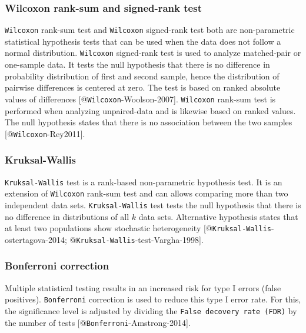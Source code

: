 \documentclass[
  parskip,
  oneside]{scrreprt}
\begin{document}
\hypertarget{wilcoxon-rank-sum-and-signed-rank-test}{%
\subsubsection{Wilcoxon rank-sum and signed-rank
test}\label{wilcoxon-rank-sum-and-signed-rank-test}}

\texttt{Wilcoxon} rank-sum test and \texttt{Wilcoxon} signed-rank test
both are non-parametric statistical hypothesis tests that can be used
when the data does not follow a normal distribution. \texttt{Wilcoxon}
signed-rank test is used to analyze matched-pair or one-sample data. It
tests the null hypothesis that there is no difference in probability
distribution of first and second sample, hence the distribution of
pairwise differences is centered at zero. The test is based on ranked
absolute values of differences {[}@\texttt{Wilcoxon}-Woolson-2007{]}.
\texttt{Wilcoxon} rank-sum test is performed when analyzing
unpaired-data and is likewise based on ranked values. The null
hypothesis states that there is no association between the two samples
{[}@\texttt{Wilcoxon}-Rey2011{]}.

\hypertarget{kruksal-wallis}{%
\subsubsection{Kruksal-Wallis}\label{kruksal-wallis}}

\texttt{Kruksal-Wallis} test is a rank-based non-parametric hypothesis
test. It is an extension of \texttt{Wilcoxon} rank-sum test and can
allows comparing more than two independent data sets.
\texttt{Kruksal-Wallis} test tests the null hypothesis that there is no
difference in distributions of all \(k\) data sets. Alternative
hypothesis states that at least two populations show stochastic
heterogeneity {[}@\texttt{Kruksal-Wallis}-ostertagova-2014;
@\texttt{Kruksal-Wallis}-test-Vargha-1998{]}.

\hypertarget{bonferroni-correction}{%
\subsubsection{Bonferroni correction}\label{bonferroni-correction}}

Multiple statistical testing results in an increased risk for type I
errors (false positives). \texttt{Bonferroni} correction is used to
reduce this type I error rate. For this, the significance level is
adjusted by dividing the \texttt{False\ decovery\ rate\ (FDR)} by the
number of tests {[}@\texttt{Bonferroni}-Amstrong-2014{]}.
\end{document}
